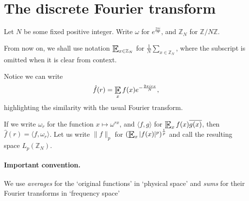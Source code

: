 \documentclass{article}
\DeclareMathOperator*{\E}{\scalerel*{\mathbb{E}}{\textstyle\sum}}
\newcommand{\1}[1]{\mathbbm{1}_{#1}}
\begin{document}
\maketitle

\tableofcontents

\clearpage
\section{The discrete Fourier transform}
Let $N$ be some fixed positive integer. Write $\omega$ for $e^{\frac{2\pi i}{N}}$, and $\mathbb{Z}_N$ for $\mathbb{Z}/N\mathbb{Z}$.


\begin{notation}
  From now on, we shall use notation $\E_{x \in \mathbb{Z}_N}$ for $\frac{1}{N} \sum_{x \in \mathbb{Z}_N}$, where the subscript is omitted when it is clear from context.
\end{notation}

Notice we can write
\begin{equation*}
  \hat{f}(r) = \E_x f(x) e^{-\frac{2 \pi i r x}{N}},
\end{equation*}
highlighting the similarity with the usual Fourier transform.

If we write $\omega_r$ for the function $x \mapsto \omega^{r x}$, and $\langle f, g \rangle$ for $\E_x f(x) \overline{g(x)}$, then $\hat{f}(r) = \langle f, \omega_r \rangle$.
Let us write $\| f \|_p$ for $\left(\E_x |f(x)|^p\right)^{\frac{1}{p}}$ and call the resulting space $L_p(\mathbb{Z}_N)$.

\paragraph{Important convention.} We use \emph{averages} for the `original functions' in `physical space' and \emph{sums} for their Fourier transforms in `frequency space'
\end{document}
